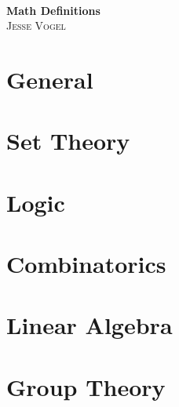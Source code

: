 \documentclass{report}
\begin{document}
\thispagestyle{empty}

\begin{center}
    \; \\ \vspace{4cm} \textbf{\Huge Math Definitions}
    \\ \vspace{2cm}
    \textsc{Jesse Vogel}
\end{center}

\newpage

{
    \tableofcontents
}

\newcommand{\cat}{}

\chapter{General}
\renewcommand{\cat}{GM}


\chapter{Set Theory}
\renewcommand{\cat}{ST}



\chapter{Logic}
\renewcommand{\cat}{LO}



\chapter{Combinatorics}
\renewcommand{\cat}{CO}



\chapter{Linear Algebra}
\renewcommand{\cat}{LA}







\chapter{Group Theory}
\renewcommand{\cat}{GT}

\end{document}
